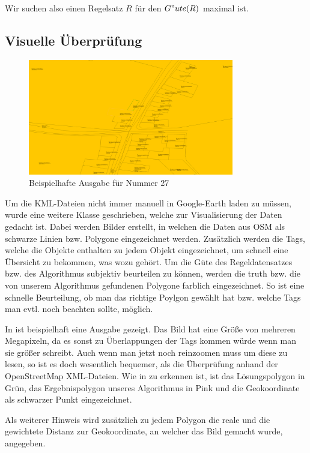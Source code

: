 Wir suchen also einen Regelsatz $R$ für den $G"ute(R)$ maximal ist.


\subsection{Visuelle Überprüfung}
\label{sec:visuelle_ueberpruefung}
\begin{figure}
\centering
\includegraphics[width=0.8\textwidth]{DataDrawer.png}
\caption{Beispielhafte Ausgabe für Nummer 27}
\label{fig:DataDrawerOrginal}
\end{figure}
Um die KML-Dateien nicht immer manuell in Google-Earth laden zu müssen, wurde eine weitere Klasse geschrieben, welche zur Visualisierung der Daten gedacht ist.
Dabei werden Bilder erstellt, in welchen die Daten aus OSM als schwarze Linien bzw. Polygone eingezeichnet werden. Zusätzlich werden die Tags,
welche die Objekte enthalten zu jedem Objekt eingezeichnet, um schnell eine Übersicht zu bekommen, was wozu gehört.
Um die Güte des Regeldatensatzes bzw. des Algorithmus subjektiv beurteilen zu können, werden die truth bzw. die von unserem Algorithmus gefundenen Polygone
farblich eingezeichnet. So ist eine schnelle Beurteilung, ob man das richtige Poylgon gewählt hat bzw. welche Tags man evtl. noch beachten sollte, möglich.

In  ist beispielhaft eine Ausgabe gezeigt. Das Bild hat eine Größe von mehreren Megapixeln, da es sonst zu Überlappungen der Tags kommen
würde wenn man sie größer schreibt. Auch wenn man jetzt noch reinzoomen muss um diese zu lesen, so ist es doch wesentlich bequemer,
als die Überprüfung anhand der OpenStreetMap XML-Dateien. Wie in  zu erkennen ist, ist das Lösungspolygon in Grün,
das Ergebnispolygon unseres Algorithmus in Pink und die Geokoordinate als schwarzer Punkt eingezeichnet.

Als weiterer Hinweis wird zusätzlich zu jedem Polygon die reale und die gewichtete Distanz zur Geokoordinate, an welcher das Bild gemacht wurde, angegeben.

